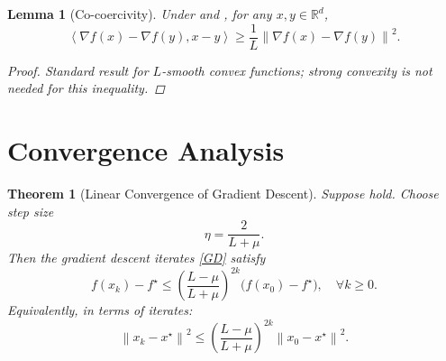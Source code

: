 \documentclass{article}
\newtheorem{lemma}{Lemma}
\newtheorem{theorem}{Theorem}
\newcommand{\R}{\mathbb{R}}
\newcommand{\norm}[1]{\left\|#1\right\|}
\newcommand{\inner}[2]{\left\langle #1, #2 \right\rangle}
\newcommand{\stepsize}{\eta}
\newcommand{\lipschitz}{L}
\newcommand{\strongconvex}{\mu}
\newcommand{\opt}{x^\star}
\newcommand{\grad}{\nabla}
\begin{document}
\begin{lemma}[Co-coercivity] \label{lemma:cocoercive}
    Under  and , for any $x, y \in \R^d$,
    \begin{equation}
        \inner{\grad f(x) - \grad f(y)}{x - y} \ge \frac{1}{\lipschitz} \norm{\grad f(x) - \grad f(y)}^2. \tag{Step 4}
    \end{equation}
    \begin{proof}
        Standard result for $L$-smooth convex functions; strong convexity is not needed for this inequality.
    \end{proof}
\end{lemma}

\section{Convergence Analysis}

\begin{theorem}[Linear Convergence of Gradient Descent] \label{thm:main}
    Suppose  hold. Choose step size
    \begin{equation}
        \stepsize = \frac{2}{\lipschitz + \strongconvex}. \tag{Step 5}
    \end{equation}
    Then the gradient descent iterates \eqref{GD} satisfy
    \begin{equation}
        f(x_k) - f^\star \le \left( \frac{\lipschitz - \strongconvex}{\lipschitz + \strongconvex} \right)^{2k} \bigl( f(x_0) - f^\star \bigr), \quad \forall k \ge 0. \tag{Step 6}
    \end{equation}
    Equivalently, in terms of iterates:
    \begin{equation}
        \norm{x_k - \opt}^2 \le \left( \frac{\lipschitz - \strongconvex}{\lipschitz + \strongconvex} \right)^{2k} \norm{x_0 - \opt}^2. \tag{Step 7}
    \end{equation}
\end{theorem}
\end{document}
